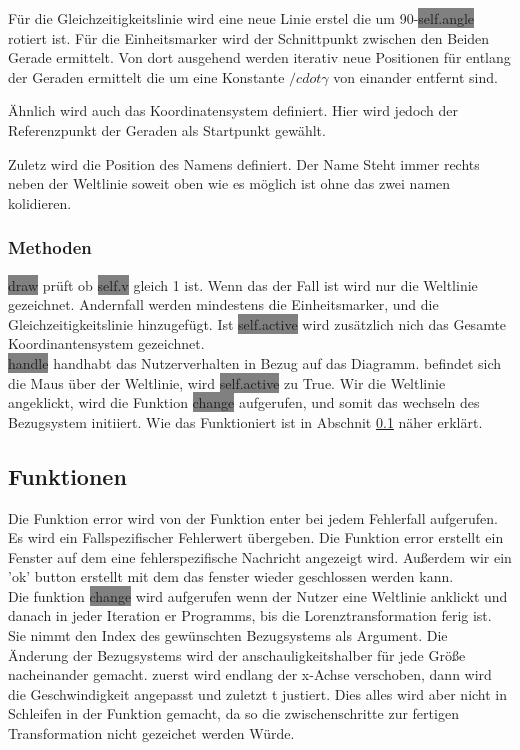 \documentclass[12pt]{article}
\begin{document}
Für die Gleichzeitigkeitslinie wird eine neue Linie erstel die um 90-\colorbox{gray}{self.angle} rotiert ist.
Für die Einheitsmarker wird der Schnittpunkt zwischen den Beiden Gerade ermittelt.
Von dort ausgehend werden iterativ neue Positionen für entlang der Geraden ermittelt die um eine Konstante $/cdot \gamma$ von einander entfernt sind.

Ähnlich wird auch das Koordinatensystem definiert.
Hier wird jedoch der Referenzpunkt der Geraden als Startpunkt gewählt.

Zuletz wird die Position des Namens definiert.
Der Name Steht immer rechts neben der Weltlinie soweit oben wie es möglich ist ohne das zwei namen kolidieren.
\subsubsection{Methoden}
\colorbox{gray}{draw} prüft ob \colorbox{gray}{self.v} gleich 1 ist.
Wenn das der Fall ist wird nur die Weltlinie gezeichnet.
Andernfall werden mindestens die Einheitsmarker, und die Gleichzeitigkeitslinie hinzugefügt.
Ist \colorbox{gray}{self.active} wird zusätzlich nich das Gesamte Koordinantensystem gezeichnet.
\\

\colorbox{gray}{handle} handhabt das Nutzerverhalten in Bezug auf das Diagramm.
befindet sich die Maus über der Weltlinie, wird \colorbox{gray}{self.active} zu True.
Wir die Weltlinie angeklickt, wird die Funktion \colorbox{gray}{change} aufgerufen, und somit das wechseln des Bezugsystem initiiert.
Wie das Funktioniert ist in Abschnit \ref{func} näher erklärt.
\subsection{Funktionen}
\label{func}
Die Funktion error wird von der Funktion enter bei jedem Fehlerfall aufgerufen.
Es wird ein Fallspezifischer Fehlerwert übergeben.
Die Funktion error erstellt ein Fenster auf dem eine fehlerspezifische Nachricht angezeigt wird.
Außerdem wir ein 'ok' button erstellt mit dem das fenster wieder geschlossen werden kann.
\\

Die funktion \colorbox{gray}{change} wird aufgerufen wenn der Nutzer eine Weltlinie anklickt und danach in jeder Iteration er Programms, bis die Lorenztransformation ferig ist.
Sie nimmt den Index des gewünschten Bezugsystems als Argument.
Die Änderung der Bezugsystems wird der anschauligkeitshalber für jede Größe nacheinander gemacht.
zuerst wird endlang der x-Achse verschoben, dann wird die Geschwindigkeit angepasst und zuletzt t justiert.
Dies alles wird aber nicht in Schleifen in der Funktion gemacht, da so die zwischenschritte zur fertigen Transformation nicht gezeichet werden Würde.
\end{document}
